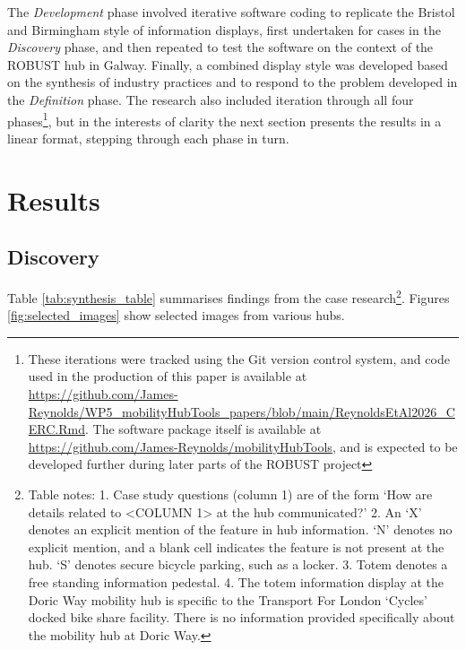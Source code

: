 \documentclass[preprint, 3p,
authoryear]{elsarticle} %
\begin{document}
The \emph{Development} phase involved iterative software coding to
replicate the Bristol and Birmingham style of information displays,
first undertaken for cases in the \emph{Discovery} phase, and then
repeated to test the software on the context of the ROBUST hub in
Galway. Finally, a combined display style was developed based on the
synthesis of industry practices and to respond to the problem developed
in the \emph{Definition} phase. The research also included iteration
through all four phases\footnote{ These iterations were tracked using
  the Git version control system, and code used in the production of
  this paper is available at
  \url{https://github.com/James-Reynolds/WP5_mobilityHubTools_papers/blob/main/ReynoldsEtAl2026_CERC.Rmd}.
  The software package itself is available at
  \url{https://github.com/James-Reynolds/mobilityHubTools}, and is
  expected to be developed further during later parts of the ROBUST
  project}, but in the interests of clarity the next section presents
the results in a linear format, stepping through each phase in turn.

\section{Results}\label{results}

\subsection{Discovery}\label{discovery}

Table \ref{tab:synthesis_table} summarises findings from the case
research\footnote{Table notes: 1. Case study questions (column 1) are of
  the form `How are details related to \textless COLUMN 1\textgreater{}
  at the hub communicated?' 2. An `X' denotes an explicit mention of the
  feature in hub information. `N' denotes no explicit mention, and a
  blank cell indicates the feature is not present at the hub. `S'
  denotes secure bicycle parking, such as a locker. 3. Totem denotes a
  free standing information pedestal. 4. The totem information display
  at the Doric Way mobility hub is specific to the Transport For London
  `Cycles' docked bike share facility. There is no information provided
  specifically about the mobility hub at Doric Way.}. Figures
\ref{fig:selected_images} show selected images from various hubs.

\begingroup\fontsize{7}{9}\selectfont
\end{document}
